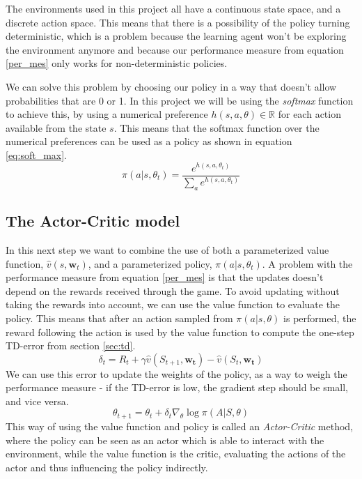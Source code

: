 \documentclass[11pt]{article}
\begin{document}
The environments used in this project all have a continuous state space,
and a discrete action space.
This means that there is a possibility of the policy turning deterministic,
which is a problem because the learning agent won't be exploring the environment anymore
and because our performance measure from equation \ref{per_mes} only works for
non-deterministic policies.

We can solve this problem by choosing our policy in a way that doesn't allow probabilities that are 0 or 1.
In this project we will be using the \textit{softmax} function to achieve this,
by using a numerical preference $h(s, a, \theta) \in \mathbb{R}$
for each action available from the state $s$.
This means that the softmax function over the numerical preferences can be used as a policy
as shown in equation \ref{eq:soft_max}.
\begin{equation}\label{eq:soft_max}
    \pi(a | s, \theta_t) = \frac{e^{h(s,a,\theta_t)}}{\sum\limits_{a} e^{h(s,a,\theta_t)}}
\end{equation}

\subsection{The Actor-Critic model}

In this next step we want to combine the use of both a parameterized value function, $\hat{v}(s, \mathbf{w}_t)$,
and a parameterized policy, $\pi(a|s, \theta_t)$.
A problem with the performance measure from equation \ref{per_mes} is that
the updates doesn't depend on the rewards received through the game.
To avoid updating without taking the rewards into account, we can
use the value function to evaluate the policy.
This means that after an action sampled from $\pi(a|s,\theta)$ is performed,
the reward following the action is used by the value function to
compute the one-step TD-error from section \ref{sec:td}.
\begin{equation*}
    \delta_t =  R_t + \gamma \hat{v} (S_{t+1}, \mathbf{w_t}) - \hat{v}(S_t, \mathbf{w_t})
\end{equation*}
We can use this error to update the weights of the policy, as
a way to weigh the performance measure - if the TD-error is low,
the gradient step should be small, and vice versa.
\begin{equation}
    \theta_{t+1} = \theta_t + \delta_t \nabla_{\theta} \log \pi(A | S, \theta)
\end{equation}
This way of using the value function and policy is called an
\textit{Actor-Critic} method, where the policy can be seen as an actor
which is able to interact with the environment, while the value function
is the critic, evaluating the actions of the actor and thus
influencing the policy indirectly.
\end{document}
